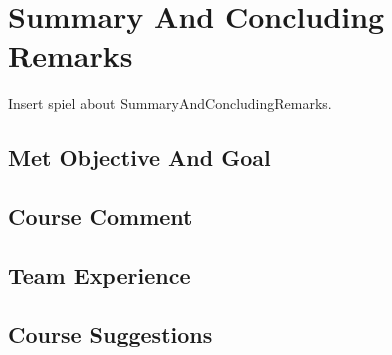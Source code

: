 

\chapter{Summary And Concluding Remarks}
Insert spiel about SummaryAndConcludingRemarks.

\section{Met Objective And Goal}


\section{Course Comment}


\section{Team Experience}


\section{Course Suggestions}


